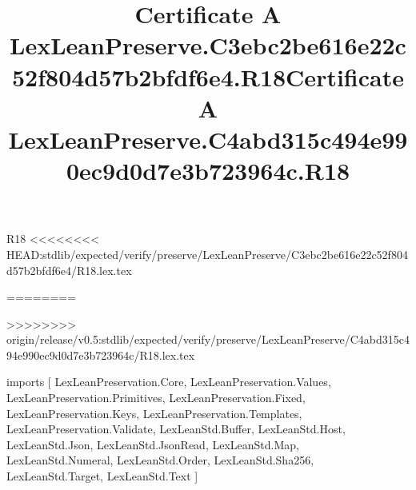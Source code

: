 \begin{lexlean}{R18}
<<<<<<<< HEAD:stdlib/expected/verify/preserve/LexLeanPreserve/C3ebc2be616e22c52f804d57b2bfdf6e4/R18.lex.tex
\title{Certificate A LexLeanPreserve.C3ebc2be616e22c52f804d57b2bfdf6e4.R18}
========
\title{Certificate A LexLeanPreserve.C4abd315c494e990ec9d0d7e3b723964c.R18}
>>>>>>>> origin/release/v0.5:stdlib/expected/verify/preserve/LexLeanPreserve/C4abd315c494e990ec9d0d7e3b723964c/R18.lex.tex
\begin{coremodule}
imports [
  LexLeanPreservation.Core,
  LexLeanPreservation.Values,
  LexLeanPreservation.Primitives,
  LexLeanPreservation.Fixed,
  LexLeanPreservation.Keys,
  LexLeanPreservation.Templates,
  LexLeanPreservation.Validate,
  LexLeanStd.Buffer,
  LexLeanStd.Host,
  LexLeanStd.Json,
  LexLeanStd.JsonRead,
  LexLeanStd.Map,
  LexLeanStd.Numeral,
  LexLeanStd.Order,
  LexLeanStd.Sha256,
  LexLeanStd.Target,
  LexLeanStd.Text
]


\end{coremodule}
\end{lexlean}
